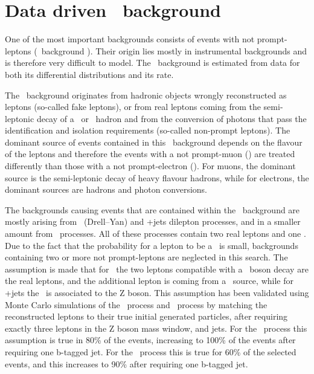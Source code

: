 \section{Data driven \NPL\ background}
\label{sec:NPL}
 One of the most important backgrounds consists of events with not prompt-leptons (\NPL\ background ). Their origin lies mostly in instrumental backgrounds and is therefore very difficult to model. The \NPL\ background  is estimated from data for both its differential distributions and its rate. 

The \NPL\ background  originates from hadronic objects wrongly reconstructed as leptons (so-called fake leptons), or from real leptons coming from the semi-leptonic decay of a \Pbottom\ or \Pcharm\ hadron and from the conversion of photons that pass the identification and isolation requirements (so-called non-prompt leptons). The dominant source of events contained in this \NPL\ background  depends on the flavour of the leptons and therefore the events with a not prompt-muon (\NPM) are treated differently than those with a not prompt-electron (\NPE). For muons, the dominant source is the semi-leptonic decay of heavy flavour hadrons, while for electrons, the dominant sources are hadrons and photon conversions. 

The backgrounds causing events that are contained within the \NPL\ background  are mostly arising from \DY\ (Drell--Yan) and \ttbar+jets dilepton processes, and in a smaller amount from \WW\ processes. All of these processes contain two real leptons and one \NPL. Due to the fact that the probability for a lepton to be a \NPL\ is small, backgrounds containing two or more  not prompt-leptons are neglected in this search. The assumption is made that for \DY\ the two leptons compatible with a \PZ\ boson decay are the real leptons, and the additional lepton is coming from a \NPL\ source, while for \ttbar+jets the \NPL\ is associated to the Z boson. This assumption has been validated using Monte Carlo simulations of the \DY\ process and \ttbar\ process by matching the reconstructed leptons to their true initial generated particles, after requiring exactly three leptons in the Z boson mass window, and jets. For the \DY\ process this assumption is true in 80\% of the events, increasing to 100\% of the events after requiring one b-tagged jet. For the \ttbar\ process this is true for 60\% of the selected events, and this increases to 90\% after requiring one b-tagged jet.

